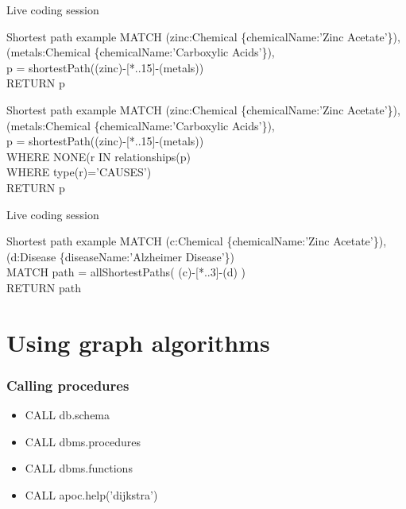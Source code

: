 \documentclass[12pt]{beamer}
\begin{document}
    \begin{frame}{Live coding session}
        \begin{block}{Shortest path example}
            MATCH (zinc:Chemical \{chemicalName:'Zinc Acetate'\}),\\
            \hspace{1cm} (metals:Chemical \{chemicalName:'Carboxylic Acids'\}),\\
            \hspace{1cm} p = shortestPath((zinc)-[*..15]-(metals))\\
            RETURN p\\
        \end{block}
        \begin{block}{Shortest path example}
            MATCH (zinc:Chemical \{chemicalName:'Zinc Acetate'\}),\\
            \hspace{1cm} (metals:Chemical \{chemicalName:'Carboxylic Acids'\}),\\
            \hspace{1cm} p = shortestPath((zinc)-[*..15]-(metals))\\
            WHERE NONE(r IN relationships(p)\\
            \hspace{2.7cm} WHERE type(r)='CAUSES')\\
            RETURN p\\
        \end{block}
    \end{frame}
    
    \begin{frame}{Live coding session}
        \begin{block}{Shortest path example}
            MATCH (c:Chemical \{chemicalName:'Zinc Acetate'\}),\\
            \hspace{1cm} (d:Disease \{diseaseName:'Alzheimer Disease'\})\\
            MATCH path = allShortestPaths( (c)-[*..3]-(d) )\\
            RETURN path
        \end{block}
    \end{frame}
    
    
    \section{Using graph algorithms}
    \begin{frame}
        \frametitle{Calling procedures}
        \begin{itemize}
            \item CALL db.schema
            \item CALL dbms.procedures
            \item CALL dbms.functions
            \item CALL apoc.help('dijkstra')
        \end{itemize}
    \end{frame}
    
\end{document}
